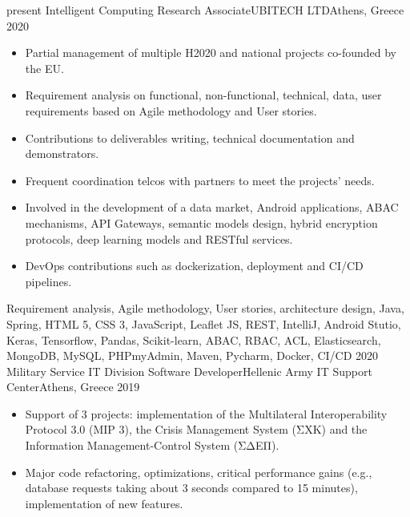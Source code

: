 \begin{experiences}
\experience
    {present}   {Intelligent Computing Research Associate}{UBITECH LTD}{Athens, Greece}
    {2020} {
                    \begin{itemize}
                      \item Partial management of multiple H2020 and national projects co-founded by the EU.

                      \item Requirement analysis on functional, non-functional, technical, data, user requirements based on Agile methodology and User stories.

                      \item Contributions to deliverables writing, technical documentation and demonstrators.

                      \item Frequent coordination telcos with partners to meet the projects' needs.

                      \item Involved in the development of a data market, Android applications, ABAC mechanisms, API Gateways, semantic models design, hybrid encryption protocols, deep learning models and RESTful services.
                      
                      \item DevOps contributions such as dockerization, deployment and CI/CD pipelines.

                    \end{itemize}
                    }
                    {Requirement analysis, Agile methodology, User stories, architecture design, Java, Spring, HTML 5, CSS 3, JavaScript, Leaflet JS, REST, IntelliJ, Android Stutio, Keras, Tensorflow, Pandas, Scikit-learn, ABAC, RBAC, ACL, Elasticsearch, MongoDB, MySQL, PHPmyAdmin, Maven, Pycharm, Docker, CI/CD}
  \emptySeparator
  \experience
    {2020}   {Military Service IT Division Software Developer}{Hellenic Army IT Support Center}{Athens, Greece}
    {2019} {
                    \begin{itemize}
                      \item Support of 3 projects: implementation of the Multilateral Interoperability Protocol 3.0 (MIP 3), the Crisis Management System (ΣΧΚ) 
                      and the Information Management-Control System (ΣΔΕΠ).

                      \item Major code refactoring, optimizations, critical performance gains (e.g., database requests taking about 3 seconds compared to 15 minutes), 
                      implementation of new features.


\end{itemize}}
\end{experiences}
